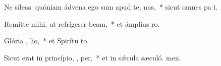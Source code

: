 \item Ne síleas: quóniam ádvena ego sum apud te,  nus,~* sicut omnes pa i.
\item Remítte mihi, ut refrígerer  beam,~* et ámplius  ro.
\item Glória ,  lio,~* et Spirítu to.
\item Sicut erat in princípio,  ,  per,~* et in sǽcula sæculó. men.
